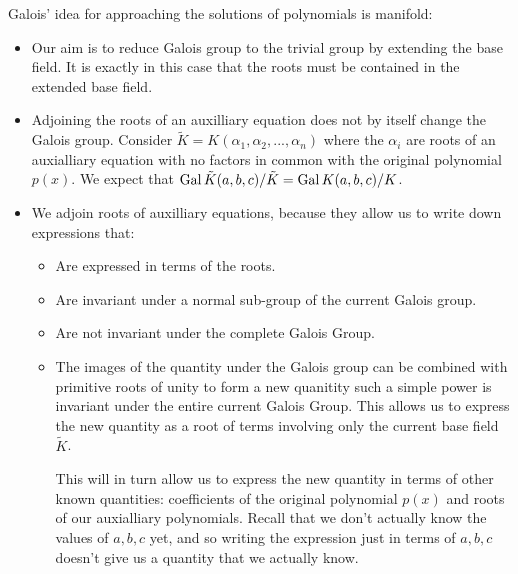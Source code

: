 Galois' idea for approaching the solutions of polynomials is manifold:
\begin{itemize}
\item Our aim is to reduce Galois group to the trivial group by extending the base field. It is exactly
in this case that the roots must be contained in the extended base field. 

\item Adjoining the roots of an auxilliary equation does not by itself change the Galois group. Consider 
\(\tilde K = K(\alpha_1, \alpha_2, ..., \alpha_n)\) where the \(\alpha_i\) are
roots of an auxialliary equation with no factors in common with the original polynomial \(p(x)\). We expect
that \(\operatorname{Gal} \tilde K(a, b, c) / \tilde K = \operatorname{Gal} K(a, b, c) / K\). 

\item We adjoin roots of auxilliary equations, because they allow us to write down expressions that:
    \begin{itemize}
    \item Are expressed in terms of the roots.
    \item Are invariant under a normal sub-group of the current Galois group.
    \item Are not invariant under the complete Galois Group.
    \item The images of the quantity under the Galois group can be combined with primitive roots of
    unity to form a new quanitity such a simple power is invariant under the entire current Galois Group.
    This allows us
    to express the new quantity as a root of terms involving only the current base field \(\tilde K\).

    This
    will in turn allow us to express the new quantity in terms of other known quantities: coefficients
    of the original polynomial \(p(x)\) and roots of our auxialliary polynomials. Recall that we
    don't actually know the values of \(a, b, c\) yet, and so writing the expression just in terms
    of \(a, b, c\) doesn't give us a quantity that we actually know. 
    \end{itemize}


\end{itemize}
